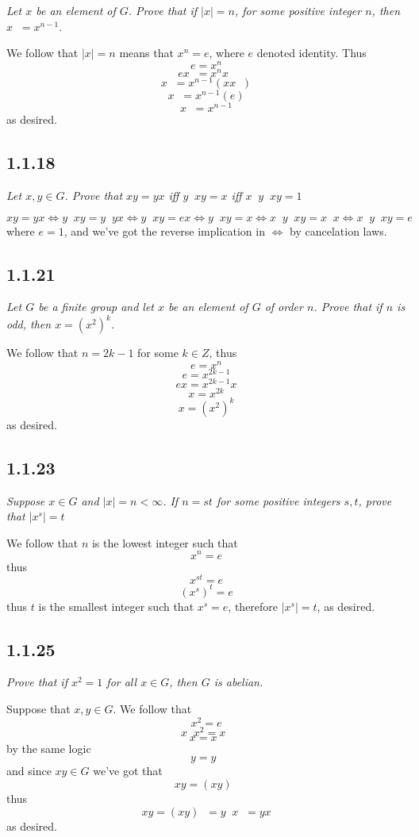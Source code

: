 \documentclass[11pt,oneside,titlepage]{book}
\DeclareMathOperator \inv {^{-1}}
\DeclareMathOperator \lra {\Leftrightarrow}
\begin{document}
\textit{Let $x$ be an element of $G$.  Prove that if $|x| = n$, for some positive integer $n$,
  then $x \inv = x^{n - 1}$.}

We follow that $|x| = n$ means that $x^n = e$, where $e$ denoted identity. Thus
$$e = x^n$$
$$e x \inv  = x^n x \inv$$
$$x \inv  = x^{n - 1} (x x \inv)$$
$$x \inv  = x^{n - 1} (e)$$
$$x \inv  = x^{n - 1}$$
as desired.

\subsection*{1.1.18}

\textit{Let $x, y \in G$. Prove that $xy = yx$ iff $y \inv xy  = x$ iff $x \inv y \inv xy = 1$}

$$xy = yx \lra y \inv x y = y \inv yx \lra y \inv x y = e x \lra y \inv x y = x \lra
x \inv y \inv x y = x \inv x \lra x \inv y \inv x y = e$$
where $e = 1$, and we've got the reverse implication in $\lra$ by cancelation laws.

\subsection*{1.1.21}

\textit{Let $G$ be a finite group and let $x$ be an element of $G$ of order $n$. Prove that
  if $n$ is odd, then $x = (x^2)^k$.}

We follow that $n = 2k - 1$ for some $k \in Z$, thus
$$e = x^n$$
$$e = x^{2k - 1}$$
$$ex = x^{2k - 1}x$$
$$x = x^{2k}$$
$$x = (x^{2})^k $$
as desired.

\subsection*{1.1.23}

\textit{Suppose $x \in G$ and $|x| = n < \infty$. If $n = st$ for some positive integers $s, t$,
  prove that $|x^s| = t$}

We follow that $n$ is the lowest integer such that
$$x^n = e$$
thus
$$x^{st} = e$$
$$(x^{s})^t = e$$
thus $t$ is the smallest integer such that $x^s = e$, therefore $|x^s| = t$, as desired.

\subsection*{1.1.25}

\textit{Prove that if $x^2 = 1$ for all $x \in G$, then $G$ is abelian.}

Suppose that $x, y \in G$. We follow that
$$x^2 = e$$
$$x\inv x^2 = x\inv$$
$$x = x\inv$$
by the same logic
$$y = y\inv$$
and since $xy \in G$ we've got that 
$$xy = (xy)\inv$$
thus
$$xy = (xy)\inv = y\inv x\inv = yx$$
as desired.
\end{document}
